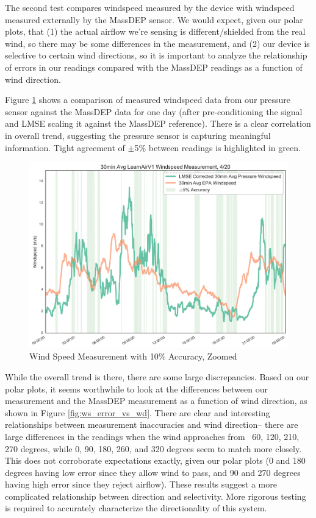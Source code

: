 \pagebreak

The second test compares windspeed measured by the device with windspeed measured externally by the MassDEP sensor.  We would expect, given our polar plots, that (1) the actual airflow we're sensing is different/shielded from the real wind, so there may be some differences in the measurement, and (2) our device is selective to certain wind directions, so it is important to analyze the relationship of errors in our readings compared with the MassDEP readings as a function of wind direction. 

Figure \ref{fig:ws_with_10_accuracy_zoomed} shows a comparison of measured windspeed data from our pressure sensor against the MassDEP data for one day (after pre-conditioning the signal and LMSE scaling it against the MassDEP reference).  There is a clear correlation in overall trend, suggesting the pressure sensor is capturing meaningful information.  Tight agreement of $\pm$5\% between readings is highlighted in green.   

\begin{figure}[htb]
 	\includegraphics[width=\textwidth]{figs/ws_with_10_accuracy_zoomed}               
 	 \caption{Wind Speed Measurement with 10\% Accuracy, Zoomed}
  	\label{fig:ws_with_10_accuracy_zoomed}
\end{figure}

While the overall trend is there, there are some large discrepancies.  Based on our polar plots, it seems worthwhile to look at the differences between our measurement and the MassDEP measurement as a function of wind direction, as shown in Figure \ref{fig:ws_error_vs_wd}.  There are clear and interesting relationships between measurement inaccuracies and wind direction-- there are large differences in the readings when the wind approaches from ~60, 120, 210, 270 degrees, while 0, 90, 180, 260, and 320 degrees seem to match more closely.  This does not corroborate expectations exactly, given our polar plots (0 and 180 degrees having low error since they allow wind to pass, and 90 and 270 degrees having high error since they reject airflow).  These results suggest a more complicated relationship between direction and selectivity.  More rigorous testing is required to accurately characterize the directionality of this system.

